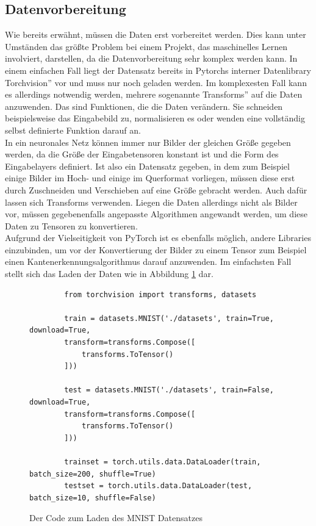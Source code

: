\documentclass[11pt]{article}
\begin{document}
\subsection{Datenvorbereitung}
Wie bereits erwähnt, müssen die Daten erst vorbereitet werden. Dies kann unter Umständen das größte Problem bei einem Projekt, das maschinelles Lernen involviert, darstellen, da die Datenvorbereitung sehr komplex werden kann. In einem einfachen Fall liegt der Datensatz bereits in Pytorchs interner Datenlibrary \glqq Torchvision'' vor und muss nur noch geladen werden. Im komplexesten Fall kann es allerdings notwendig werden, mehrere sogenannte \glqq Transforms'' auf die Daten anzuwenden. Das sind Funktionen, die die Daten verändern. Sie schneiden beispielsweise das Eingabebild zu, normalisieren es oder wenden eine vollständig selbst definierte Funktion darauf an.\\
In ein neuronales Netz können immer nur Bilder der gleichen Größe gegeben werden, da die Größe der Eingabetensoren konstant ist und die Form des Eingabelayers definiert. Ist also ein Datensatz gegeben, in dem zum Beispiel  einige Bilder im Hoch- und einige im Querformat vorliegen, müssen diese erst durch Zuschneiden und Verschieben auf eine Größe gebracht werden. Auch dafür lassen sich Transforms verwenden. Liegen die Daten allerdings nicht als Bilder vor, müssen gegebenenfalls angepasste Algorithmen angewandt werden, um diese Daten zu Tensoren zu konvertieren.\\
Aufgrund der Vielseitigkeit von PyTorch ist es ebenfalls möglich, andere Libraries einzubinden, um vor der Konvertierung der Bilder zu einem Tensor zum Beispiel einen Kantenerkennungsalgorithmus darauf anzuwenden. Im einfachsten Fall stellt sich das Laden der Daten wie in Abbildung \ref{MNIST_Dataloader_Code} dar.
\newpage
\begin{figure}[h]
	\begin{verbatim}
		from torchvision import transforms, datasets
	
		train = datasets.MNIST('./datasets', train=True, download=True,
		transform=transforms.Compose([
			transforms.ToTensor()
		]))
		
		test = datasets.MNIST('./datasets', train=False, download=True,
		transform=transforms.Compose([
			transforms.ToTensor()
		]))
		
		trainset = torch.utils.data.DataLoader(train, batch_size=200, shuffle=True)
		testset = torch.utils.data.DataLoader(test, batch_size=10, shuffle=False)
	\end{verbatim}
	\caption{Der Code zum Laden des MNIST Datensatzes}
	\label{MNIST_Dataloader_Code}
\end{figure}
\end{document}
